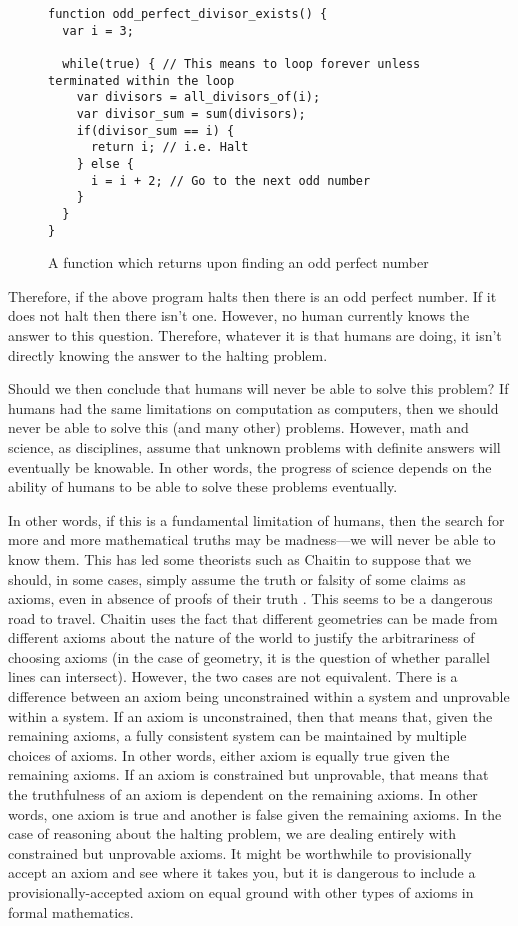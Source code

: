 \begin{figure}[H]
\begin{mdframed}
\begin{verbatim}
function odd_perfect_divisor_exists() {
  var i = 3;

  while(true) { // This means to loop forever unless terminated within the loop
    var divisors = all_divisors_of(i);
    var divisor_sum = sum(divisors);
    if(divisor_sum == i) {
      return i; // i.e. Halt
    } else {
      i = i + 2; // Go to the next odd number
    }
  }
}
\end{verbatim}
\end{mdframed}
\caption{A function which returns upon finding an odd perfect number}
\end{figure}

Therefore, if the above program halts then there is an odd perfect number.  If it does not halt then there isn't one.  However, no human currently knows the answer to this question.  Therefore, whatever it is that humans are doing, it isn't directly knowing the answer to the halting problem.

Should we then conclude that humans will never be able to solve this problem?  If humans had the same limitations on computation as computers, then we should never be able to solve this (and many other) problems.  However, math and science, as disciplines, assume that unknown problems with definite answers will eventually be knowable.  In other words, the progress of science depends on the ability of humans to be able to solve these problems eventually.

In other words, if this is a fundamental limitation of humans, then the search for more and more mathematical truths may be madness---we will never be able to know them.  This has led some theorists such as Chaitin to suppose that we should, in some cases, simply assume the truth or falsity of some claims as axioms, even in absence of proofs of their truth \citep{chaitin2006}.  This seems to be a dangerous road to travel.  Chaitin uses the fact that different geometries can be made from different axioms about the nature of the world to justify the arbitrariness of choosing axioms (in the case of geometry, it is the question of whether parallel lines can intersect).  However, the two cases are not equivalent.  There is a difference between an axiom being unconstrained within a system and unprovable within a system.  If an axiom is unconstrained, then that means that, given the remaining axioms, a fully consistent system can be maintained by multiple choices of axioms.  In other words, either axiom is equally true given the remaining axioms.  If an axiom is constrained but unprovable, that means that the truthfulness of an axiom is dependent on the remaining axioms.  In other words, one axiom is true and another is false given the remaining axioms.  In the case of reasoning about the halting problem, we are dealing entirely with constrained but unprovable axioms.  It might be worthwhile to provisionally accept an axiom and see where it takes you, but it is dangerous to include a provisionally-accepted axiom on equal ground with other types of axioms in formal mathematics.

